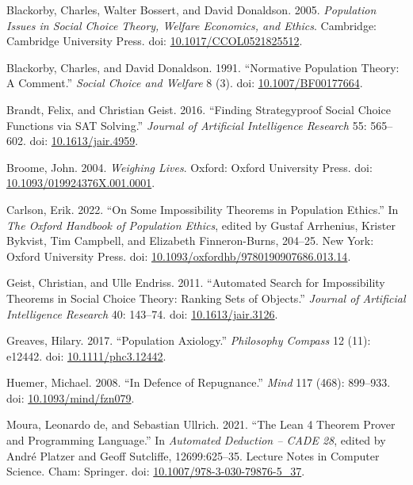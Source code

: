 \documentclass[
  11pt,
  letterpaper,
  DIV=11,
  numbers=noendperiod,
  twoside]{scrartcl}
\newlength{\cslhangindent}
\newenvironment{CSLReferences}[2] %
 {\begin{list}{}{%
  \setlength{\itemindent}{0pt}
  \setlength{\leftmargin}{0pt}
  \setlength{\parsep}{0pt}
  \ifodd #1
   \setlength{\leftmargin}{\cslhangindent}
   \setlength{\itemindent}{-1\cslhangindent}
  \fi
  \setlength{\itemsep}{#2\baselineskip}}}
 {\end{list}}
\begin{document}
\begin{CSLReferences}{1}{0}
Blackorby, Charles, Walter Bossert, and David Donaldson. 2005.
\emph{Population Issues in Social Choice Theory, Welfare Economics, and
Ethics}. Cambridge: Cambridge University Press. doi:
\href{https://doi.org/10.1017/CCOL0521825512}{10.1017/CCOL0521825512}.

Blackorby, Charles, and David Donaldson. 1991. {``Normative Population
Theory: A Comment.''} \emph{Social Choice and Welfare} 8 (3). doi:
\href{https://doi.org/10.1007/BF00177664}{10.1007/BF00177664}.

Brandt, Felix, and Christian Geist. 2016. {``Finding Strategyproof
Social Choice Functions via {SAT} Solving.''} \emph{Journal of
Artificial Intelligence Research} 55: 565--602. doi:
\href{https://doi.org/10.1613/jair.4959}{10.1613/jair.4959}.

Broome, John. 2004. \emph{Weighing Lives}. Oxford: Oxford University
Press. doi:
\href{https://doi.org/10.1093/019924376X.001.0001}{10.1093/019924376X.001.0001}.

Carlson, Erik. 2022. {``On Some Impossibility Theorems in Population
Ethics.''} In \emph{The Oxford Handbook of Population Ethics}, edited by
Gustaf Arrhenius, Krister Bykvist, Tim Campbell, and Elizabeth
Finneron-Burns, 204--25. New York: Oxford University Press. doi:
\href{https://doi.org/10.1093/oxfordhb/9780190907686.013.14}{10.1093/oxfordhb/9780190907686.013.14}.

Geist, Christian, and Ulle Endriss. 2011. {``Automated Search for
Impossibility Theorems in Social Choice Theory: Ranking Sets of
Objects.''} \emph{Journal of Artificial Intelligence Research} 40:
143--74. doi:
\href{https://doi.org/10.1613/jair.3126}{10.1613/jair.3126}.

Greaves, Hilary. 2017. {``Population Axiology.''} \emph{Philosophy
Compass} 12 (11): e12442. doi:
\href{https://doi.org/10.1111/phc3.12442}{10.1111/phc3.12442}.

Huemer, Michael. 2008. {``In Defence of Repugnance.''} \emph{Mind} 117
(468): 899--933. doi:
\href{https://doi.org/10.1093/mind/fzn079}{10.1093/mind/fzn079}.

Moura, Leonardo de, and Sebastian Ullrich. 2021. {``The {L}ean 4 Theorem
Prover and Programming Language.''} In \emph{Automated Deduction -- CADE
28}, edited by André Platzer and Geoff Sutcliffe, 12699:625--35. Lecture
Notes in Computer Science. Cham: Springer. doi:
\href{https://doi.org/10.1007/978-3-030-79876-5_37}{10.1007/978-3-030-79876-5\_37}.


\end{CSLReferences}
\end{document}
